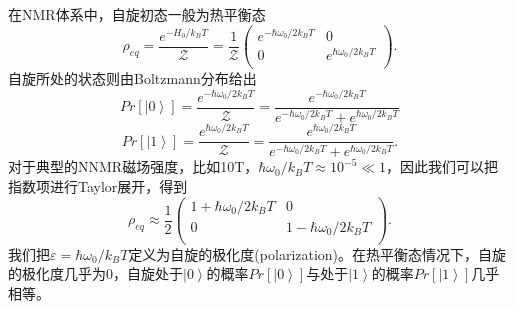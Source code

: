 在NMR体系中，自旋初态一般为热平衡态
\begin{equation}\label{aaa}
\rho_{eq} = \frac{e^{-H_0/k_BT}}{\mathcal{Z}} = \frac{1}{\mathcal{Z}}\left(
                                                                       \begin{array}{cc}
                                                                         e^{-\hbar \omega_0/2k_BT} & 0 \\
                                                                         0 & e^{\hbar \omega_0/2k_BT} \\
                                                                       \end{array}
                                                                     \right).
\end{equation}
自旋所处的状态则由Boltzmann分布给出
\begin{equation}\label{aaa}
Pr[\left\vert 0 \right\rangle] = \frac{e^{-\hbar \omega_0/2k_BT}}{\mathcal{Z}} = \frac{e^{-\hbar \omega_0/2k_BT} }{e^{-\hbar \omega_0/2k_BT} +e^{\hbar \omega_0/2k_BT} }
\end{equation}
\begin{equation}\label{aaa}
Pr[\left\vert 1 \right\rangle] = \frac{e^{\hbar \omega_0/2k_BT}}{\mathcal{Z}} = \frac{e^{\hbar \omega_0/2k_BT} }{e^{-\hbar \omega_0/2k_BT} +e^{\hbar \omega_0/2k_BT} }.
\end{equation}
对于典型的NNMR磁场强度，比如10T，$\hbar \omega_0/k_BT\approx 10^{-5} \ll 1$，因此我们可以把指数项进行Taylor展开，得到
\begin{equation}\label{aaa}
\rho_{eq} \approx \frac{1}{2}\left(
                                                                       \begin{array}{cc}
                                                                         1+ \hbar \omega_0/2k_BT & 0 \\
                                                                         0 & 1 - \hbar \omega_0/2k_BT \\
                                                                       \end{array}
                                                                     \right).
\end{equation}
我们把$\varepsilon = \hbar \omega_0/k_BT$定义为自旋的极化度(polarization)。在热平衡态情况下，自旋的极化度几乎为0，自旋处于$\left\vert 0 \right\rangle$的概率$Pr[\left\vert 0 \right\rangle]$与处于$\left\vert 1 \right\rangle$的概率$Pr[\left\vert 1 \right\rangle]$几乎相等。

